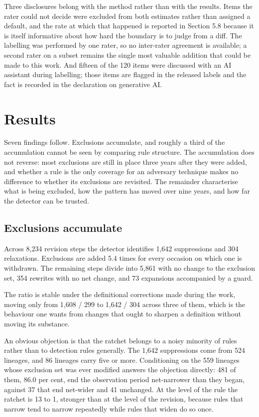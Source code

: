 Three disclosures belong with the method rather than with the results. Items the rater could not decide were excluded from both estimates rather than assigned a default, and the rate at which that happened is reported in Section 5.8 because it is itself informative about how hard the boundary is to judge from a diff. The labelling was performed by one rater, so no inter-rater agreement is available; a second rater on a subset remains the single most valuable addition that could be made to this work. And fifteen of the 120 items were discussed with an AI assistant during labelling; those items are flagged in the released labels and the fact is recorded in the declaration on generative AI.

\section{Results}
\label{sec:results}

Seven findings follow. Exclusions accumulate, and roughly a third of the accumulation cannot be seen by comparing rule structure. The accumulation does not reverse: most exclusions are still in place three years after they were added, and whether a rule is the only coverage for an adversary technique makes no difference to whether its exclusions are revisited. The remainder characterise what is being excluded, how the pattern has moved over nine years, and how far the detector can be trusted.

\subsection{Exclusions accumulate}

Across 8,234 revision steps the detector identifies 1,642 suppressions and 304 relaxations. Exclusions are added 5.4 times for every occasion on which one is withdrawn. The remaining steps divide into 5,861 with no change to the exclusion set, 354 rewrites with no net change, and 73 expansions accompanied by a guard.

The ratio is stable under the definitional corrections made during the work, moving only from 1,608 / 299 to 1,642 / 304 across three of them, which is the behaviour one wants from changes that ought to sharpen a definition without moving its substance.

An obvious objection is that the ratchet belongs to a noisy minority of rules rather than to detection rules generally. The 1,642 suppressions come from 524 lineages, and 86 lineages carry five or more. Conditioning on the 559 lineages whose exclusion set was ever modified answers the objection directly: 481 of them, 86.0 per cent, end the observation period net-narrower than they began, against 37 that end net-wider and 41 unchanged. At the level of the rule the ratchet is 13 to 1, stronger than at the level of the revision, because rules that narrow tend to narrow repeatedly while rules that widen do so once.

